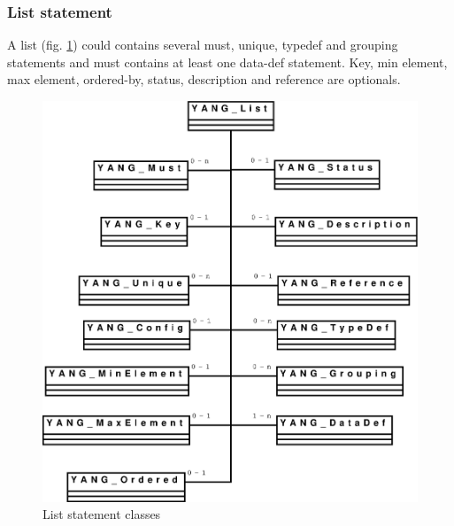 \documentclass[a4paper]{article}
\begin{document}
\subsubsection{List statement}

A list (fig. \ref{list})  could contains several must, unique, typedef
and  grouping  statements and  must  contains  at  least one  data-def
statement.  Key,   min  element,  max   element,  ordered-by,  status,
description and reference are optionals.
\begin{figure}[htbp]
\begin{center}
\includegraphics[scale = .3]{list.eps}
\end{center}
\caption{List statement classes}
\label{list}
\end{figure}
\end{document}
